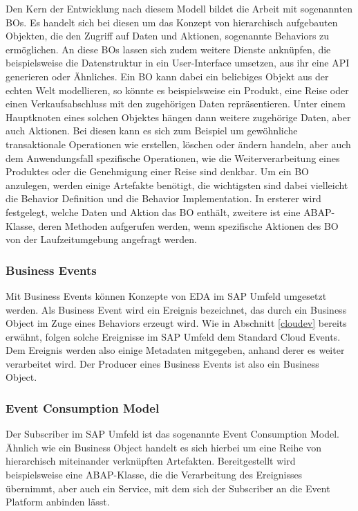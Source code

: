 Den Kern der Entwicklung nach diesem Modell bildet die Arbeit mit sogenannten \ac{BO}s. Es handelt sich bei diesen um das Konzept von hierarchisch aufgebauten Objekten, die den Zugriff auf Daten und Aktionen, sogenannte Behaviors zu ermöglichen. An diese \ac{BO}s lassen sich zudem weitere Dienste anknüpfen, die beispielsweise die Datenstruktur in ein User-Interface umsetzen, aus ihr eine \ac{API} generieren oder Ähnliches. Ein \ac{BO} kann dabei ein beliebiges Objekt aus der echten Welt modellieren, so könnte es beispielsweise ein Produkt, eine Reise oder einen Verkaufsabschluss mit den zugehörigen Daten repräsentieren. Unter einem Hauptknoten eines solchen Objektes hängen dann weitere zugehörige Daten, aber auch Aktionen. Bei diesen kann es sich zum Beispiel um gewöhnliche transaktionale Operationen wie erstellen, löschen oder ändern handeln, aber auch dem Anwendungsfall spezifische Operationen, wie die Weiterverarbeitung eines Produktes oder die Genehmigung einer Reise sind denkbar. Um ein \ac{BO} anzulegen, werden einige Artefakte benötigt, die wichtigsten sind dabei vielleicht die Behavior Definition und die Behavior Implementation. In ersterer wird festgelegt, welche Daten und Aktion das \ac{BO} enthält, zweitere ist eine \ac{ABAP}-Klasse, deren Methoden aufgerufen werden, wenn spezifische Aktionen des \ac{BO} von der Laufzeitumgebung angefragt werden. \cite[Vgl.][]{sapse_rap}

\subsubsection*{Business Events}
Mit Business Events können Konzepte von \ac{EDA} im SAP Umfeld umgesetzt werden. Als Business Event wird ein Ereignis bezeichnet, das durch ein Business Object im Zuge eines Behaviors erzeugt wird. Wie in Abschnitt \ref{cloudev} bereits erwähnt, folgen solche Ereignisse im SAP Umfeld dem Standard Cloud Events. Dem Ereignis werden also einige Metadaten mitgegeben, anhand derer es weiter verarbeitet wird. Der Producer eines Business Events ist also ein Business Object.\ \cite[Vgl.][]{sapse_bes}

\subsubsection*{Event Consumption Model}
\label{ecm}
Der Subscriber im SAP Umfeld ist das sogenannte Event Consumption Model. Ähnlich wie ein Business Object handelt es sich hierbei um eine Reihe von hierarchisch miteinander verknüpften Artefakten. Bereitgestellt wird beispielsweise eine \ac{ABAP}-Klasse, die die Verarbeitung des Ereignisses übernimmt, aber auch ein Service, mit dem sich der Subscriber an die Event Platform anbinden lässt. \cite[Vgl.][]{sapse_bes}

